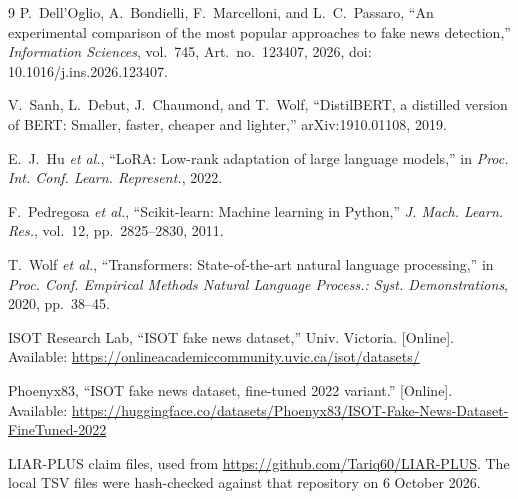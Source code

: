 \documentclass[conference,letterpaper]{IEEEtran}
\begin{document}
\begin{thebibliography}{9}
P.~Dell'Oglio, A.~Bondielli, F.~Marcelloni, and L.~C.~Passaro, ``An experimental comparison of the most popular approaches to fake news detection,'' \emph{Information Sciences}, vol.~745, Art.~no.~123407, 2026, doi: 10.1016/j.ins.2026.123407.

V.~Sanh, L.~Debut, J.~Chaumond, and T.~Wolf, ``DistilBERT, a distilled version of BERT: Smaller, faster, cheaper and lighter,'' arXiv:1910.01108, 2019.

E.~J.~Hu \emph{et al.}, ``LoRA: Low-rank adaptation of large language models,'' in \emph{Proc. Int. Conf. Learn. Represent.}, 2022.

F.~Pedregosa \emph{et al.}, ``Scikit-learn: Machine learning in Python,'' \emph{J. Mach. Learn. Res.}, vol.~12, pp.~2825--2830, 2011.

T.~Wolf \emph{et al.}, ``Transformers: State-of-the-art natural language processing,'' in \emph{Proc. Conf. Empirical Methods Natural Language Process.: Syst. Demonstrations}, 2020, pp.~38--45.

ISOT Research Lab, ``ISOT fake news dataset,'' Univ. Victoria. [Online]. Available: \url{https://onlineacademiccommunity.uvic.ca/isot/datasets/}

Phoenyx83, ``ISOT fake news dataset, fine-tuned 2022 variant.'' [Online]. Available: \url{https://huggingface.co/datasets/Phoenyx83/ISOT-Fake-News-Dataset-FineTuned-2022}

LIAR-PLUS claim files, used from \url{https://github.com/Tariq60/LIAR-PLUS}. The local TSV files were hash-checked against that repository on 6 October 2026.
\end{thebibliography}
\end{document}
